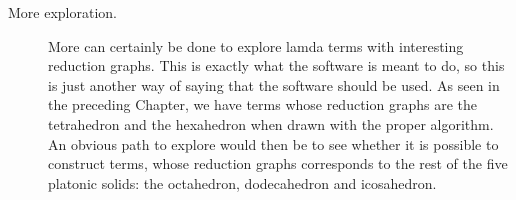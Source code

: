 \begin{description}
	\item[More exploration.] More can certainly be done to explore lamda
	terms with interesting reduction graphs. This is exactly what the software is meant
	to do, so this is just another way of saying that the software should be used.
	As seen in the preceding Chapter, we have terms whose reduction graphs are
	the tetrahedron and the hexahedron when drawn with the proper algorithm. An obvious 
	path to explore would then be to see whether it is possible to construct terms,
	whose reduction graphs corresponds to the rest of the five platonic solids: 
	the octahedron, dodecahedron and icosahedron.
	
\end{description}
